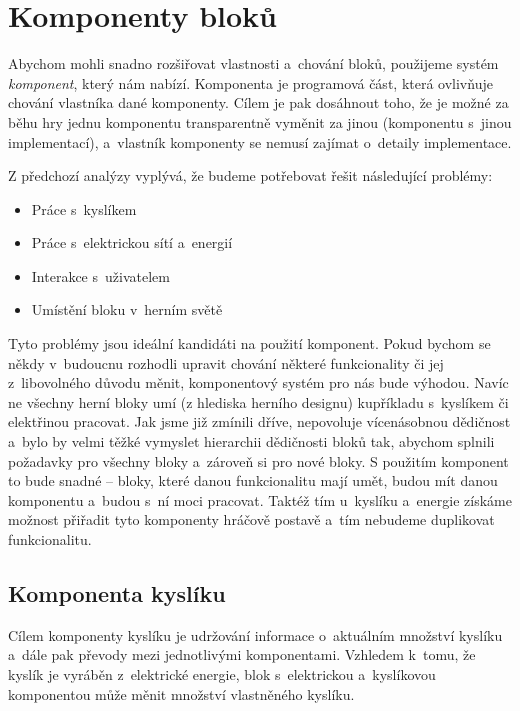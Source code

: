 


\section{Komponenty bloků}

Abychom mohli snadno rozšiřovat vlastnosti a~chování bloků, použijeme systém \textit{komponent}, který nám \UE{} nabízí. Komponenta je programová část, která ovlivňuje chování vlastníka dané komponenty. Cílem je pak dosáhnout toho, že je možné za běhu hry jednu komponentu transparentně vyměnit za jinou (komponentu s~jinou implementací), a~vlastník komponenty se nemusí zajímat o~detaily implementace.

Z předchozí analýzy vyplývá, že budeme potřebovat řešit následující problémy:

\begin{itemize}
	\item Práce s~kyslíkem
	\item Práce s~elektrickou sítí a~energií
	\item Interakce s~uživatelem
	\item Umístění bloku v~herním světě
\end{itemize}


Tyto problémy jsou ideální kandidáti na použití komponent. Pokud bychom se někdy v~budoucnu rozhodli upravit chování některé funkcionality či jej z~libovolného důvodu měnit, komponentový systém pro nás bude výhodou. Navíc ne všechny herní bloky umí (z hlediska herního designu) kupříkladu s~kyslíkem či elektřinou pracovat. Jak jsme již zmínili dříve, \UE{} nepovoluje vícenásobnou dědičnost a~bylo by velmi těžké vymyslet hierarchii dědičnosti bloků tak, abychom splnili požadavky pro všechny bloky a~zároveň si  pro nové bloky. S použitím komponent to bude snadné -- bloky, které danou funkcionalitu mají umět, budou mít danou komponentu a~budou s~ní moci pracovat. Taktéž tím u~kyslíku a~energie získáme možnost přiřadit tyto komponenty hráčově postavě a~tím nebudeme duplikovat funkcionalitu.

\subsection{Komponenta kyslíku}

Cílem komponenty kyslíku je udržování informace o~aktuálním množství \linebreak {} kyslíku a~dále pak převody mezi jednotlivými komponentami. Vzhledem k~tomu, že kyslík je vyráběn z~elektrické energie, blok s~elektrickou a~kyslíkovou komponentou může měnit množství vlastněného kyslíku. 

